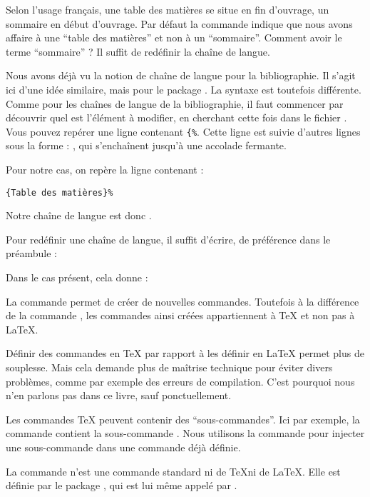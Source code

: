 Selon l'usage français, une table des matières se situe en fin d'ouvrage, un sommaire  en début d'ouvrage. Par défaut la commande  indique que nous avons affaire à une  \enquote{table des matières} et non  à un \enquote{sommaire}. Comment avoir le terme  \enquote{sommaire} ? Il suffit de redéfinir la chaîne de langue. 

Nous avons déjà vu la notion de chaîne de langue pour la bibliographie. Il s'agit ici  d'une idée similaire, mais pour le package . La syntaxe est toutefois différente. Comme pour les  chaînes de langue de la bibliographie, il faut commencer par découvrir quel est l'élément à modifier, en cherchant cette fois dans le fichier . Vous pouvez repérer une ligne contenant \verb|{%|. 
Cette ligne est suivie d'autres lignes sous la forme : , qui s'enchaînent jusqu'à une accolade fermante.

Pour notre cas, on repère la ligne contenant :

 \verb|{Table des matières}%|

Notre chaîne de langue est donc .

Pour  redéfinir une chaîne de langue, il suffit d'écrire, de préférence dans le préambule :

\begin{latexcode}
\gappto\captionsfrench{\renewcommand{<\chaine>}{Valeur}}
\end{latexcode}

Dans le cas présent, cela donne :

\begin{latexcode}
\gappto\captionsfrench{\renewcommand{\contentsname}{Sommaire}}
\end{latexcode}



\begin{plusloins}
La commande  permet de créer de nouvelles commandes. Toutefois à la différence de la commande , les commandes ainsi créées appartiennent à \TeX{} et non pas à \LaTeX{}.

Définir des commandes en \TeX{} par rapport à les définir en \LaTeX{} permet plus de souplesse. Mais cela demande plus de maîtrise technique pour éviter divers problèmes, comme par exemple des erreurs de compilation. C'est pourquoi nous n'en parlons pas dans ce livre, sauf ponctuellement.

Les commandes \TeX{} peuvent contenir des \enquote{sous-commandes}. Ici par exemple, la commande  contient la sous-commande . Nous utilisons la commande   pour injecter une sous-commande dans une commande déjà définie.

La commande  n'est une commande standard ni de \TeX ni de \LaTeX. Elle est définie par le package , qui est lui même appelé par .
\end{plusloins}

